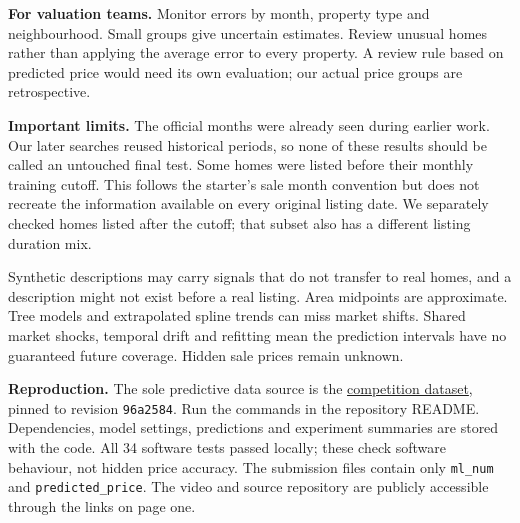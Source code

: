 \documentclass[10pt]{article}
\begin{document}
\textbf{For valuation teams.} Monitor errors by month, property type and neighbourhood. Small groups give uncertain estimates. Review unusual homes rather than applying the average error to every property. A review rule based on predicted price would need its own evaluation; our actual price groups are retrospective.

\textbf{Important limits.} The official months were already seen during earlier work. Our later searches reused historical periods, so none of these results should be called an untouched final test. Some homes were listed before their monthly training cutoff. This follows the starter's sale month convention but does not recreate the information available on every original listing date. We separately checked homes listed after the cutoff; that subset also has a different listing duration mix.

Synthetic descriptions may carry signals that do not transfer to real homes, and a description might not exist before a real listing. Area midpoints are approximate. Tree models and extrapolated spline trends can miss market shifts. Shared market shocks, temporal drift and refitting mean the prediction intervals have no guaranteed future coverage. Hidden sale prices remain unknown.

\textbf{Reproduction.} The sole predictive data source is the \href{https://huggingface.co/datasets/Baliyang/SSU_data_dash}{competition dataset}, pinned to revision \texttt{96a2584}. Run the commands in the repository README. Dependencies, model settings, predictions and experiment summaries are stored with the code. All 34 software tests passed locally; these check software behaviour, not hidden price accuracy. The submission files contain only \texttt{ml\_num} and \texttt{predicted\_price}. The video and source repository are publicly accessible through the links on page one.
\end{document}
